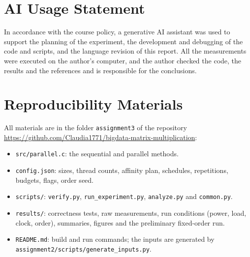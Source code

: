\documentclass[12pt,a4paper]{report}
\begin{document}
\chapter*{AI Usage Statement}

In accordance with the course policy, a generative AI assistant was used to support the planning of the experiment,
the development and debugging of the code and scripts, and the language revision of this report. All the measurements
were executed on the author's computer, and the author checked the code, the results and the references and is
responsible for the conclusions.

\chapter*{Reproducibility Materials}

All materials are in the folder \texttt{assignment3} of the repository
\url{https://github.com/Claudia1771/bigdata-matrix-multiplication}:
\begin{itemize}
  \item \texttt{src/parallel.c}: the sequential and parallel methods.
  \item \texttt{config.json}: sizes, thread counts, affinity plan, schedules, repetitions, budgets, flags, order seed.
  \item \texttt{scripts/}: \texttt{verify.py}, \texttt{run\_experiment.py}, \texttt{analyze.py} and
  \texttt{common.py}.
  \item \texttt{results/}: correctness tests, raw measurements, run conditions (power, load, clock, order), summaries,
  figures and the preliminary fixed-order run.
  \item \texttt{README.md}: build and run commands; the inputs are generated by
  \texttt{assignment2/scripts/generate\_inputs.py}.
\end{itemize}
\end{document}
